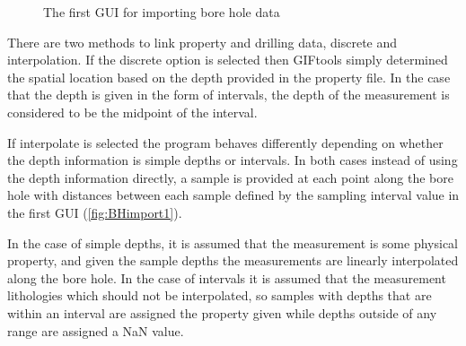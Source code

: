  \begin{figure} [h]
    \centering
    \caption{The first \ac{GUI} for importing bore hole data}
    \label{fig:BHimport1}
\end{figure}

There are two methods to link property and drilling data,  discrete and interpolation. If the discrete option is selected then GIFtools simply determined the spatial location based on the depth provided in the property file. In the case that the depth is given in the form of intervals, the depth of the measurement is considered to be the midpoint of the interval. 

If interpolate is selected the program behaves differently depending on whether the depth information is simple depths or intervals. In both cases instead of using the depth information directly, a sample is provided at each point along the bore hole with distances between each sample defined by the sampling interval value in the first \ac{GUI} (\autoref{fig:BHimport1}).

In the case of simple depths, it is assumed that the measurement is some physical property, and given the sample depths the measurements are linearly interpolated along the bore hole. In the case of intervals it is assumed that the measurement lithologies which should not be interpolated, so samples with depths that are within an interval are assigned the property given while depths outside of any range are assigned a NaN value.

